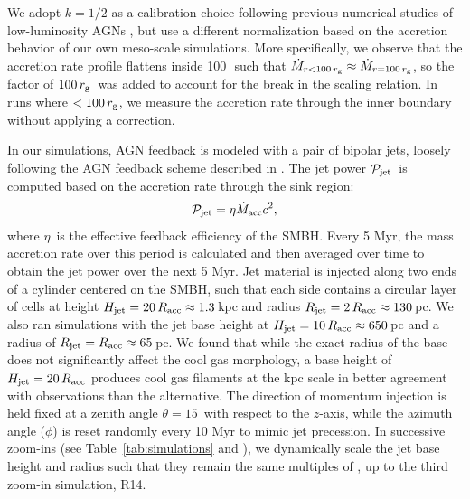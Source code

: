 We adopt $k=1/2$ as a calibration choice following previous numerical studies of low-luminosity AGNs \citep[e.g.,][]{yuan_numerical_2012, guo_magnetized_2024}, but use a different normalization based on the accretion behavior of our own meso-scale simulations.
More specifically, we observe that the accretion rate profile flattens inside 100\,\rg\ such that $\dot{M}_{r<100\,r_{\rm g}} \approx \dot{M}_{r = 100\,r_{\rm g}}$, so the factor of $100\,r_{\rm g}$\ was added to account for the break in the scaling relation.
In runs where \racc $< 100\,r_{\rm g}$, we measure the accretion rate through the inner boundary without applying a correction.

In our simulations, AGN feedback is modeled with a pair of bipolar jets, loosely following the AGN feedback scheme described in \citet{li_2014a,li_2014b}. The jet power $\mathcal{P}_{\rm jet}$\ is computed based on the accretion rate through the sink region:
\begin{equation} \label{eq:jet_power}
    \mathcal{P}_{\rm jet} = \eta \dot{M}_{\rm acc} c^2,
\end{equation}
where $\eta$\ is the effective feedback efficiency of the SMBH\@.
Every 5 Myr, the mass accretion rate over this period is calculated and then averaged over time to obtain the jet power over the next 5 Myr.
Jet material is injected along two ends of a cylinder centered on the SMBH, such that each side contains a circular layer of cells at height $H_{\rm jet} = 20\,R_{\rm acc} \approx 1.3$\,kpc and radius $R_{\rm jet} = 2\,R_{\rm acc} \approx 130$\,pc.
We also ran simulations with the jet base height at $H_{\rm jet} = 10\,R_{\rm acc} \approx 650$\,pc and a radius of $R_{\rm jet} = R_{\rm acc} \approx 65$\,pc. We found that while the exact radius of the base does not significantly affect the cool gas morphology, a base height of $H_{\rm jet} =20\,R_{\rm acc}$ produces cool gas filaments at the kpc scale in better agreement with observations than the alternative.
The direction of momentum injection is held fixed at a zenith angle $\theta =15$\textdegree~with respect to the $z$-axis, while the azimuth angle ($\phi$) is reset randomly every 10 Myr to mimic jet precession.
In successive zoom-ins (see Table~\ref{tab:simulations} and ), we dynamically scale the jet base height and radius such that they remain the same multiples of \racc, up to the third zoom-in simulation, R14.

